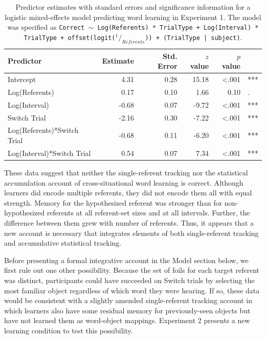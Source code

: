\documentclass[man,floatsintext]{apa6}
\begin{document}
\begin{table}[tb]
\begin{center}
\begin{tabular}{lrrrrl}
 Predictor & Estimate & Std. Error & $z$ value & $p$ value &  \\ 
  \hline
  Intercept & 4.31 & 0.28 & 15.18 & <.001 & *** \\ 
  Log(Referents) & 0.17 & 0.10 & 1.66 & 0.10 & . \\ 
  Log(Interval) & -0.68 & 0.07 & -9.72 & <.001 & *** \\ 
  Switch Trial & -2.16 & 0.30 & -7.22 & <.001 & *** \\ 
  Log(Referents)*Switch Trial & -0.68 & 0.11 & -6.20 & <.001 & *** \\ 
  Log(Interval)*Switch Trial & 0.54 & 0.07 & 7.34 & <.001 & *** \\ 
   \hline
\end{tabular}\end{center}
\vspace{6pt}
\caption{\label{tab:exp1_reg}Predictor estimates with standard errors and significance information for a logistic mixed-effects model predicting word learning in Experiment 1. The model was specified as \small{\tt{Correct $\sim$ Log(Referents) * TrialType + Log(Interval) * TrialType + offset(logit($^1/_{Referents}$)) + (TrialType | subject)}}.}
\end{table}

These data suggest that neither the single-referent tracking nor the statistical accumulation account of cross-situational word learning is correct. Although learners did encode multiple referents, they did not encode them all with equal strength. Memory for the hypothesized referent was stronger than for non-hypothesized referents at all referent-set sizes and at all intervals. Further, the difference between them grew with number of referents. Thus, it appears that a new account is necessary that integrates elements of both single-referent tracking and accumulative statistical tracking.

Before presenting a formal integrative account in the Model section below, we first rule out one other possibility. Because the set of foils for each target referent was distinct, participants could have succeeded on Switch trials by selecting the most familiar object regardless of which word they were hearing. If so, these data would be consistent with a slightly amended single-referent tracking account in which learners also have some residual memory for previously-seen objects but have not learned them as word-object mappings. Experiment 2 presents a new learning condition to test this possibility.
\end{document}
